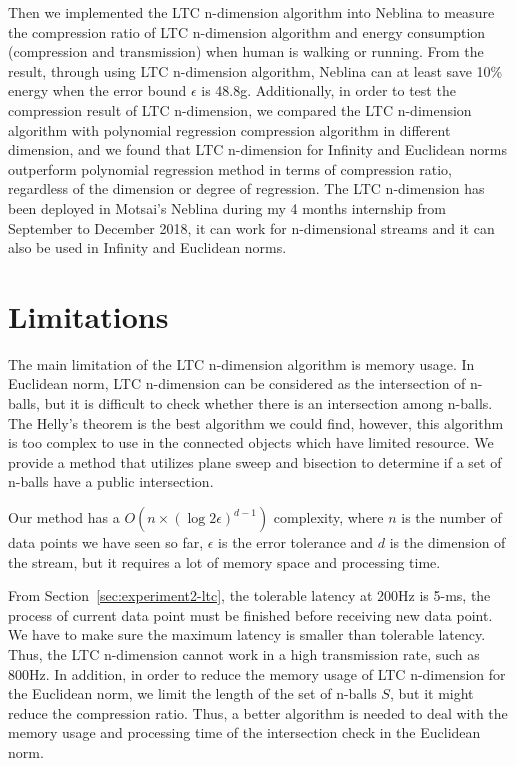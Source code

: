 Then we implemented the LTC n-dimension algorithm into Neblina to measure the
compression ratio of LTC n-dimension algorithm and energy consumption
(compression and transmission) when human is walking or running. From the
result, through using LTC n-dimension algorithm, Neblina can at least save 10\%
energy when the error bound $\epsilon$ is 48.8g. Additionally, in order to test
the compression result of LTC n-dimension, we compared the LTC n-dimension
algorithm with polynomial regression compression algorithm in different
dimension, and we found that LTC n-dimension for Infinity and Euclidean norms
outperform polynomial regression method in terms of compression ratio,
regardless of the dimension or degree of regression. The LTC n-dimension has
been deployed in Motsai's Neblina during my 4 months internship from September
to December 2018, it can work for n-dimensional streams and it can also be used
in Infinity and Euclidean norms.

\section{Limitations}


The main limitation of the LTC n-dimension algorithm is memory usage. In
Euclidean norm, LTC n-dimension can be considered as the intersection of
n-balls, but it is difficult to check whether there is an intersection among
n-balls. The Helly's theorem is the best algorithm we could find,
however, this algorithm is too complex to use in the connected objects which
have limited resource.  We provide a method that utilizes plane sweep and
bisection to determine if a set of n-balls have a public intersection.

Our method has a $O(n\times (\log{2\epsilon})^{d-1})$ complexity,
where $n$ is the number of data points we have seen so far, $\epsilon$ is the
error tolerance and $d$ is the dimension of the stream, but it requires a lot of
memory space and processing time. 

From Section~\ref{sec:experiment2-ltc}, the tolerable latency at 200Hz is
5-ms, the process of current data point must be finished before receiving new
data point. We have to make sure the maximum latency is smaller than tolerable
latency. Thus, the LTC n-dimension cannot work in a high transmission rate, such
as 800Hz. In addition, in order to reduce the memory usage of LTC n-dimension
for the Euclidean norm, we limit the length of the set of n-balls $S$, but it
might reduce the compression ratio. Thus, a better algorithm is needed to deal
with the memory usage and processing time of the intersection check in the
Euclidean norm.


